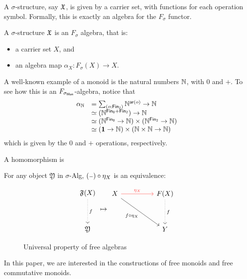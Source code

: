 A $\sigma$-structure, say $\mathfrak{X}$, is given by a carrier set, with functions for each operation symbol. Formally, this is exactly an algebra for the $F_{\sigma}$ functor.
\begin{definition}[Structure]
    A $\sigma$-structure $\mathfrak{X}$ is an $F_{\sigma}$ algebra, that is:
    \begin{itemize}
        \item a carrier set $X$, and
        \item an algebra map $\alpha_{X}\colon F_{\sigma}(X) \to X$.
    \end{itemize}
\end{definition}

\begin{example}
    A well-known example of a monoid is the natural numbers $\mathbb{N}$, with $0$ and $+$.
    To see how this is an $F_{\sigma_{\mathsf{Mon}}}$-algebra, notice that
    \[
        \begin{array}{rl}
            \alpha_{\Nat} &= \dsum{o:\Fin[2]}{\Nat^{\term{ar}(o)}} \to \Nat \\
                          &\eqv (\Nat^{\Fin[0] + \Fin[2]}) \to \Nat \\
                          &\eqv (\Nat^{\Fin[0]} \to \Nat) \times (\Nat^{\Fin[2]} \to \Nat) \\
                          &\eqv (\unitt \to \Nat) \times (\Nat \times \Nat \to \Nat)
        \end{array}
    \]
    which is given by the $0$ and $+$ operations, respectively.
\end{example}

\begin{definition}[Homomorphism]
    A homomorphism is
\end{definition}

For any object \( \mathfrak{Y} \) in $\sigma$-Alg, $({\scriptstyle{-}}) \circ \eta_X$ is an equivalence:

\begin{figure}[H]
    \centering
    \[\begin{tikzcd}[ampersand replacement=\&]
    	\mathfrak{F}(X) \\
    	\\
    	\mathfrak{Y}
    	\arrow["f", dotted, from=1-1, to=3-1]
    \end{tikzcd}
    \mapsto
    \begin{tikzcd}[ampersand replacement=\&]
    	X \&\& {F(X)} \\
    	\\
    	\&\& {Y}
    	\arrow["\eta_X", color={rgb,255:red,255;green,54;blue,51}, from=1-1, to=1-3]
    	\arrow["f \circ \eta_X"', from=1-1, to=3-3]
    	\arrow["{f}", dotted, from=1-3, to=3-3]
    \end{tikzcd}\]
    \caption{Universal property of free algebras}
    \label{fig:universal-property}
\end{figure}



In this paper, we are interested in the constructions of free monoids and free commutative monoids.